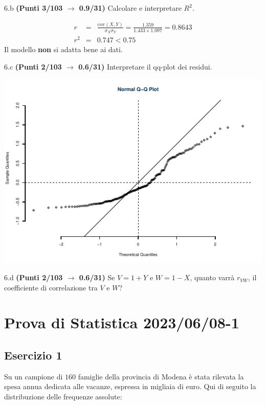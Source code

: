 \documentclass[
  11pt,
]{book}
\theoremstyle{mytheoremstyle}
\theoremstyle{mydefstyle}
\newenvironment{sol}
  {
  \begin{tcolorbox}[enhanced,breakable,arc=0.1mm,boxrule=1pt,colback=white,colframe=iblue,
  title=\bf \fontfamily{lmss}\selectfont \hspace{.5 cm} Soluzione,drop fuzzy shadow]

}{
\end{tcolorbox}
  }
\begin{document}
6.b \textbf{(Punti 3/103 \(\rightarrow\) 0.9/31)} Calcolare e interpretare \(R^2\).

\begin{sol}
\begin{eqnarray*}
r&=&\frac{\text{cov}(X,Y)}{\sigma_X\sigma_Y}=\frac{ 1.359 }{ 1.433 \times 1.097 }= 0.8643 \\r^2&=& 0.747 < 0.75
\end{eqnarray*}
Il modello \textbf{non} si adatta bene ai dati.

\end{sol}

6.c \textbf{(Punti 2/103 \(\rightarrow\) 0.6/31)} Interpretare il qq-plot dei residui.

\begin{center}\includegraphics{Esami_passati_con_soluzioni_files/figure-latex/2023-32,-1} \end{center}

6.d \textbf{(Punti 2/103 \(\rightarrow\) 0.6/31)} Se \(V=1+ Y\) e \(W=1-X\), quanto varrà \(r_{VW}\), il coefficiente di correlazione tra \(V\) e \(W\)?

\section{Prova di Statistica 2023/06/08-1}\label{prova-di-statistica-20230608-1}

\subsection{Esercizio 1}\label{esercizio-1-26}

Su un campione di \(160\) famiglie della provincia di Modena è stata rilevata la spesa annua dedicata alle vacanze, espressa in migliaia di euro. Qui di seguito la distribuzione delle frequenze assolute:
\end{document}

